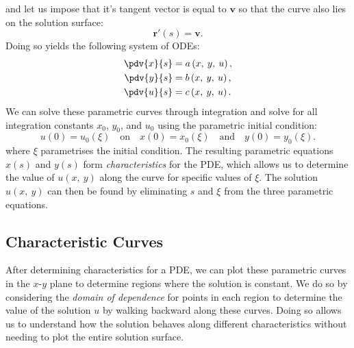 \documentclass{article}
\theoremstyle{definition}
\begin{document}
and let us impose that it's tangent vector is equal to \(\symbf{v}\)
so that the curve also lies on the solution surface:
\begin{equation*}
    \symbf{r}'\left( s \right) = \symbf{v}.
\end{equation*}
Doing so yields the following system of ODEs:
\begin{align*}
    \displaystyle\pdv{x}{s} & = a\left( x,\: y,\: u \right), \\
    \displaystyle\pdv{y}{s} & = b\left( x,\: y,\: u \right), \\
    \displaystyle\pdv{u}{s} & = c\left( x,\: y,\: u \right).
\end{align*}
We can solve these parametric curves through integration and solve for
all integration constants \(x_0\), \(y_0\), and \(u_0\) using the
parametric initial condition:
\begin{equation*}
    u\left( 0 \right) = u_0\left( \xi \right) \quad \text{on} \quad x\left( 0 \right) = x_0\left( \xi \right) \quad \text{and} \quad y\left( 0 \right) = y_0\left(\xi \right).
\end{equation*}
where \(\xi\) parametrises the initial condition. The resulting parametric
equations \(x\left( s \right)\) and \(y\left( s \right)\) form
\textit{characteristics} for the PDE, which allows us to determine the
value of \(u\left( x,\: y \right)\) along the curve for specific values
of \(\xi\). The solution \(u\left( x,\: y \right)\) can then be found by
eliminating \(s\) and \(\xi\) from the three parametric equations.
\subsection{Characteristic Curves}
After determining characteristics for a PDE, we can plot these
parametric curves in the \(x\)-\(y\) plane to determine regions where
the solution is constant. We do so by considering the \textit{domain of
dependence} for points in each region to determine the value of the
solution \(u\) by walking backward along these curves. Doing so allows
us to understand how the solution behaves along different
characteristics without needing to plot the entire solution surface.
\end{document}

